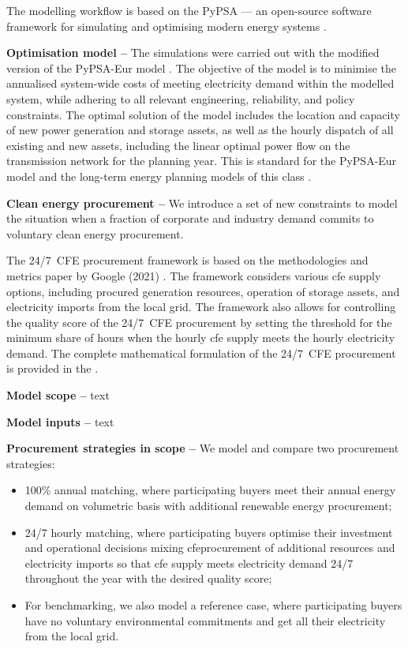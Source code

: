 The modelling workflow is based on the PyPSA --- an open-source software framework for simulating and optimising modern energy systems \cite{brownPyPSAPythonPower2018}. 

\textbf{Optimisation model --} The simulations were carried out with the modified version of the PyPSA-Eur model \cite{PyPSA-Eur-github}. 
The objective of the model is to minimise the annualised system-wide costs of meeting electricity demand within the modelled system, while adhering to all relevant engineering, reliability, and policy constraints.
The optimal solution of the model includes the location and capacity of new power generation and storage assets, as well as the hourly dispatch of all existing and new assets, including the linear optimal power flow on the transmission network for the planning year. This is standard for the PyPSA-Eur model \cite{horschPyPSAEurOpenOptimisation2018} and the long-term energy planning models of this class \cite{jenkinsGenX2022, howellsOSeMOSYSOpenSource2011}.

\textbf{Clean energy procurement --} We introduce a set of new constraints to model the situation when a fraction of corporate and industry demand commits to voluntary clean energy procurement. %

The 24/7~CFE procurement framework is based on the methodologies and metrics paper by Google (2021) \cite{google-methodologies}.
The framework considers various \gls{cfe} supply options, including procured generation resources, operation of storage assets, and electricity imports from the local grid. 
The framework also allows for controlling the quality score of the 24/7~CFE procurement by setting the threshold for the minimum share of hours when the hourly \gls{cfe} supply meets the hourly electricity demand. 
The complete mathematical formulation of the 24/7~CFE procurement is provided in the .

\textbf{Model scope --} text

\textbf{Model inputs --} text


\textbf{Procurement strategies in scope --} We model and compare two procurement strategies: 

\begin{itemize}[-]
    \item 100\% annual matching, where participating buyers meet their annual energy demand on volumetric basis with additional renewable energy procurement;
    \item 24/7 hourly matching, where participating buyers optimise their investment and operational decisions mixing \gls{cfe}procurement of additional resources and electricity imports so that \gls{cfe} supply meets electricity demand 24/7 throughout the year with the desired quality score;
    \item For benchmarking, we also model a reference case, where participating buyers have no voluntary environmental commitments and get all their electricity from the local grid.
\end{itemize}

